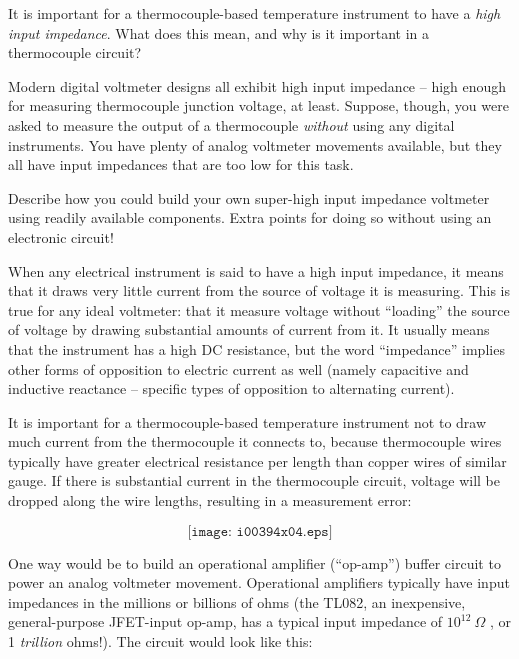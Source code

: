 

It is important for a thermocouple-based temperature instrument to have a {\it high input impedance}.  What does this mean, and why is it important in a thermocouple circuit?

\vskip 10pt

Modern digital voltmeter designs all exhibit high input impedance -- high enough for measuring thermocouple junction voltage, at least.  Suppose, though, you were asked to measure the output of a thermocouple {\it without} using any digital instruments.  You have plenty of analog voltmeter movements available, but they all have input impedances that are too low for this task.

Describe how you could build your own super-high input impedance voltmeter using readily available components.  Extra points for doing so without using an electronic circuit!







When any electrical instrument is said to have a high input impedance, it means that it draws very little current from the source of voltage it is measuring.  This is true for any ideal voltmeter: that it measure voltage without ``loading'' the source of voltage by drawing substantial amounts of current from it.  It usually means that the instrument has a high DC resistance, but the word ``impedance'' implies other forms of opposition to electric current as well (namely capacitive and inductive reactance -- specific types of opposition to alternating current).

It is important for a thermocouple-based temperature instrument not to draw much current from the thermocouple it connects to, because thermocouple wires typically have greater electrical resistance per length than copper wires of similar gauge.  If there is substantial current in the thermocouple circuit, voltage will be dropped along the wire lengths, resulting in a measurement error:

$$\texttt{[image: i00394x04.eps]}$$

\vskip 10pt

One way would be to build an operational amplifier (``op-amp'') buffer circuit to power an analog voltmeter movement.  Operational amplifiers typically have input impedances in the millions or billions of ohms (the TL082, an inexpensive, general-purpose JFET-input op-amp, has a typical input impedance of $10^{12} \> \Omega$ , or 1 {\it trillion} ohms!).  The circuit would look like this:

